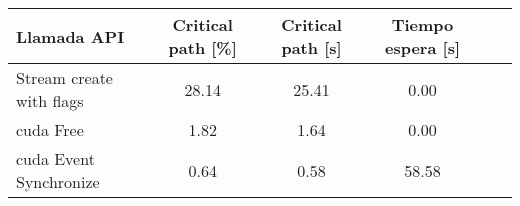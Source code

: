 

\begin{table}[]
\centering

\begin{tabular}{lccccc}
\toprule
Llamada API              & Critical path {[}\%{]} & Critical path {[}s{]} & Tiempo espera {[}s{]} \\
\midrule
Stream create with flags & 28.14                  & 25.41                 & 0.00                  \\
cuda Free                 & 1.82                   & 1.64                  & 0.00                  \\
cuda Event Synchronize        & 0.64                   & 0.58                  & 58.58                \\
\bottomrule
\end{tabular}

\end{table}